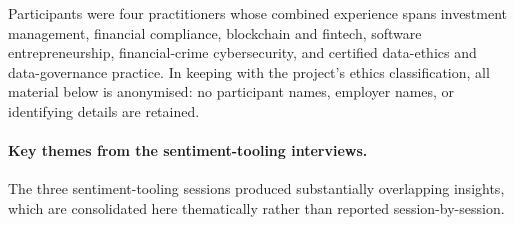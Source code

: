 Participants were four practitioners whose combined experience spans investment management, financial compliance, blockchain and fintech, software entrepreneurship, financial-crime cybersecurity, and certified data-ethics and data-governance practice. In keeping with the project's ethics classification, all material below is anonymised: no participant names, employer names, or identifying details are retained.

\paragraph{Key themes from the sentiment-tooling interviews.}
The three sentiment-tooling sessions produced substantially overlapping insights, which are consolidated here thematically rather than reported session-by-session.

